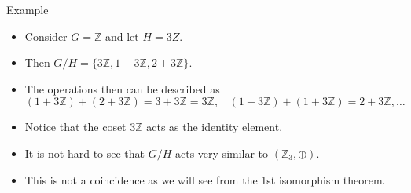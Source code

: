 \documentclass[ %
 10pt, xcolor={dvipsnames,svgnames,x11names,hyperref},
   hyperref={colorlinks=true,citecolor=green,linkcolor=DarkRed,urlcolor=ProcessBlue,anchorcolor=blue}
  ]{beamer}
\newenvironment{stepitemize}{\begin{itemize}[<+->]}{\end{itemize} }
\newcommand{\Z}{\mathbb{Z}}
\begin{document}
\begin{frame}{Example}
\begin{stepitemize}
\item Consider $G = \Z$ and let $H=3Z$. 
\item Then $G/H = \{3\Z, 1+3\Z, 2+3\Z\}$. 
\item The operations then can be described as 
$$(1+3\Z)+(2+3\Z) = 3+3\Z = 3\Z, \:\:\:\: (1+3\Z)+(1+3\Z) = 2+3\Z, \dots$$
\item Notice that the coset $3\Z$ acts as the identity element. 
\item It is not hard to see that $G/H$ acts very similar to $(\Z_3, \oplus)$. 
\item This is not a coincidence as we will see from the 1st isomorphism theorem.
\end{stepitemize}    
\end{frame}
\end{document}
